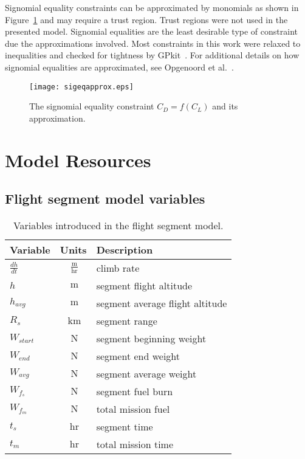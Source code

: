Signomial equality constraints can be approximated by monomials as shown in
Figure~\ref{f:sigeq} and may require a trust region. Trust regions were not
used in the presented model. Signomial equalities are the least desirable type
of constraint due the approximations involved. Most constraints in this work
were relaxed to inequalities and checked for tightness by GPkit~\cite{gpkit}. For
additional details on how signomial equalities are approximated, see Opgenoord
et al.~\cite{sigeqpaper}.

\begin{figure}[!ht]
\centering
\texttt{[image: sigeqapprox.eps]}
\caption{The signomial equality constraint $C_{D} = f(C_{L})$ and its
approximation.}\label{f:sigeq}
\end{figure}

\chapter{Model Resources}

\section{Flight segment model variables}
\label{a:flightprofilevars}

\begin{footnotesize}
    \begin{table}[H]
        \centering
        \begin{tabular}{l c l}
            \toprule
            Variable & Units & Description \\
            \midrule
            $\frac{dh}{dt}$  & $~\mathrm{\tfrac{m}{hr}}$ & climb rate \\
            $h$ & $~\mathrm{m}$ & segment flight altitude\\
            $h_{avg}$ & $~\mathrm{m}$ & segment average flight altitude\\
            $R_s$ & $~\mathrm{km}$ & segment range\\
            $W_{start}$  & $~\mathrm{N}$ & segment beginning weight\\
            $W_{end}$ & $~\mathrm{N}$ & segment end weight\\
            $W_{avg}$ & $~\mathrm{N}$ & segment average weight\\
            $W_{f_s}$ & $~\mathrm{N}$ & segment fuel burn\\
            $W_{f_m}$  & $~\mathrm{N}$ & total mission fuel\\
            $t_s$ & $~\mathrm{hr}$ & segment time\\
            $t_m$  & $~\mathrm{hr}$ & total mission time\\
            \bottomrule
        \end{tabular}
        \caption{Variables introduced in the flight segment model.}
        \label{t:vars_flightprofile}
    \end{table}
\end{footnotesize}
